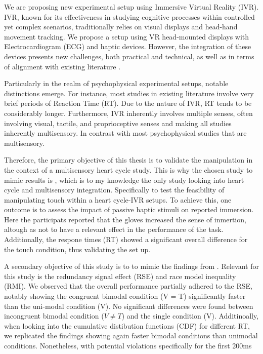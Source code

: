 \documentclass[12pt,oneside,openright]{report}
\begin{document}
We are proposing new experimental setup using Immersive Virtual Reality (IVR). IVR, known for its effectiveness in studying cognitive processes within controlled yet complex scenarios, traditionally relies on visual displays and head-hand movement tracking. We propose a setup using VR head-mounted displays with Electrocardiogram (ECG) and haptic devices. However, the integration of these devices presents new challenges, both practical and technical, as well as in terms of alignment with existing literature \parencite{Klotzsche2023}.

Particularly in the realm of psychophysical experimental setups, notable distinctions emerge. For instance, most studies in existing literature involve very brief periods of Reaction Time (RT). Due to the nature of IVR, RT tends to be considerably longer. Furthermore, IVR inherently involves multiple senses,  often involving visual, tactile, and proprioceptive senses and making all studies inherently multisensory. In contrast with most psychophysical studies that are multisensory. 

Therefore, the primary objective of this thesis is to validate the manipulation in the context of a multisensory heart cycle study. This is why the chosen study to mimic results is \textcite{SALTAFOSSI2023108642}, which is to my knowledge the only study looking into heart cycle and multisensory integration. Specifically to test the feasibility of manipulating touch within a heart cycle-IVR setups. To achieve this, one outcome is to assess the impact of passive haptic stimuli on reported immersion. Here the participats reported that the gloves increased the sense of inmertion, altough as not to have a relevant effect in the performance of the task. Additionally, the respone times (RT) showed a significant overall difference for the touch condition, thus validating the set up.

A secondary objective of this study is to to mimic the findings from \textcite{SALTAFOSSI2023108642}. Relevant for this study is the redundancy signal effect (RSE) and race model inequality (RMI). We observed that the overall performance partially adhered to the RSE, notably showing the congruent bimodal condition (V = T) significantly faster than the uni-modal condition (V). No significant differences were found between incongruent bimodal condition ($V \neq T$) and the single condition (V). Additinoally, when looking into the cumulative distibution functions (CDF) for different RT, we replicated the findings showing again faster bimodal conditions than unimodal conditions. Nonetheless, with potential violations specifically for the first 200ms
\end{document}
